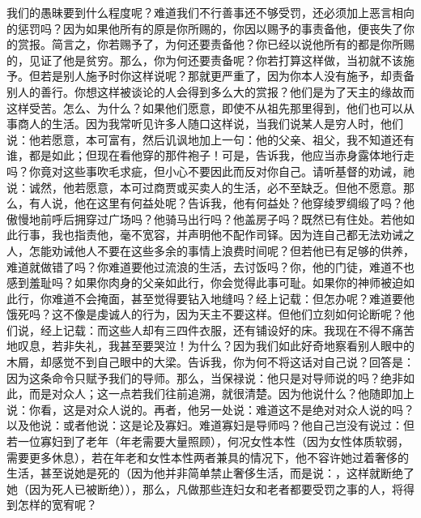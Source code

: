 我们的愚昧要到什么程度呢？难道我们不行善事还不够受罚，还必须加上恶言相向的惩罚吗？因为如果他所有的原是你所赐的，你因以赐予的事责备他，便丧失了你的赏报。简言之，你若赐予了，为何还要责备他？你已经以说他所有的都是你所赐的，见证了他是贫穷。那么，你为何还要责备呢？你若打算这样做，当初就不该施予。但若是别人施予时你这样说呢？那就更严重了，因为你本人没有施予，却责备别人的善行。你想这样被谈论的人会得到多么大的赏报？他们是为了天主的缘故而这样受苦。怎么、为什么？如果他们愿意，即使不从祖先那里得到，他们也可以从事商人的生活。因为我常听见许多人随口这样说，当我们说某人是穷人时，他们说：他若愿意，本可富有，然后讥讽地加上一句：他的父亲、祖父，我不知道还有谁，都是如此；但现在看他穿的那件袍子！可是，告诉我，他应当赤身露体地行走吗？你竟对这些事吹毛求疵，但小心不要因此而反对你自己。请听基督的劝诫，祂说：诚然，他若愿意，本可过商贾或买卖人的生活，必不至缺乏。但他不愿意。那么，有人说，他在这里有何益处呢？告诉我，他有何益处？他穿绫罗绸缎了吗？他傲慢地前呼后拥穿过广场吗？他骑马出行吗？他盖房子吗？既然已有住处。若他如此行事，我也指责他，毫不宽容，并声明他不配作司铎。因为连自己都无法劝诫之人，怎能劝诫他人不要在这些多余的事情上浪费时间呢？但若他已有足够的供养，难道就做错了吗？你难道要他过流浪的生活，去讨饭吗？你，他的门徒，难道不也感到羞耻吗？如果你肉身的父亲如此行，你会觉得此事可耻。如果你的神师被迫如此行，你难道不会掩面，甚至觉得要钻入地缝吗？经上记载：但怎办呢？难道要他饿死吗？这不像是虔诚人的行为，因为天主不要这样。但他们立刻如何论断呢？他们说，经上记载：而这些人却有三四件衣服，还有铺设好的床。我现在不得不痛苦地叹息，若非失礼，我甚至要哭泣！为什么？因为我们如此好奇地察看别人眼中的木屑，却感觉不到自己眼中的大梁。告诉我，你为何不将这话对自己说？回答是：因为这条命令只赋予我们的导师。那么，当保禄说：他只是对导师说的吗？绝非如此，而是对众人；这一点若我们往前追溯，就很清楚。因为他说什么？他随即加上说：你看，这是对众人说的。再者，他另一处说：难道这不是绝对对众人说的吗？以及他说：或者他说：这是论及寡妇。难道寡妇是导师吗？他自己岂没有说过：但若一位寡妇到了老年（年老需要大量照顾），何况女性本性（因为女性体质软弱，需要更多休息），若在年老和女性本性两者兼具的情况下，他不容许她过着奢侈的生活，甚至说她是死的（因为他并非简单禁止奢侈生活，而是说：，这样就断绝了她（因为死人已被断绝）），那么，凡做那些连妇女和老者都要受罚之事的人，将得到怎样的宽宥呢？\par

